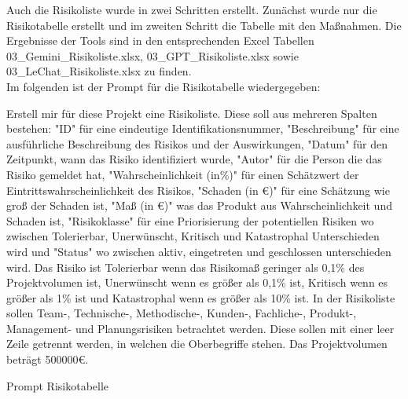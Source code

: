Auch die Risikoliste wurde in zwei Schritten erstellt. Zunächst wurde nur die Risikotabelle erstellt und im zweiten 
Schritt die Tabelle mit den Maßnahmen. Die Ergebnisse der Tools sind in den entsprechenden Excel Tabellen 
03\_Gemini\_Risikoliste.xlsx, 03\_GPT\_Risikoliste.xlsx sowie 03\_LeChat\_Risikoliste.xlsx zu finden.\\

Im folgenden ist der Prompt für die Risikotabelle wiedergegeben:

\begin{prompt}[H]
    \begin{tcolorbox}[colback=gray!20, colframe=gray!20, boxrule=0pt, sharp corners] 
        Erstell mir für diese Projekt eine Risikoliste. Diese soll aus mehreren Spalten bestehen: "ID" für eine 
        eindeutige Identifikationsnummer, "Beschreibung" für eine ausführliche Beschreibung des Risikos und der 
        Auswirkungen, "Datum" für den Zeitpunkt, wann das Risiko identifiziert wurde, "Autor" für die Person die 
        das Risiko gemeldet hat, "Wahrscheinlichkeit (in\%)" für einen Schätzwert der Eintrittswahrscheinlichkeit 
        des Risikos, "Schaden (in €)" für eine Schätzung wie groß der Schaden ist, "Maß (in €)" was das Produkt aus 
        Wahrscheinlichkeit und Schaden ist, "Risikoklasse" für eine Priorisierung der potentiellen Risiken wo 
        zwischen Tolerierbar, Unerwünscht, Kritisch und Katastrophal Unterschieden wird und "Status" wo zwischen 
        aktiv, eingetreten und geschlossen unterschieden wird. Das Risiko ist Tolerierbar wenn das Risikomaß geringer 
        als 0,1\% des Projektvolumen ist, Unerwünscht wenn es größer als 0,1\% ist, Kritisch wenn es größer als 1\% 
        ist und Katastrophal wenn es größer als 10\% ist. In der Risikoliste sollen Team-, Technische-, Methodische-, 
        Kunden-, Fachliche-, Produkt-, Management- und Planungsrisiken betrachtet werden. Diese sollen mit einer 
        leer Zeile getrennt werden, in welchen die Oberbegriffe stehen. Das Projektvolumen beträgt 500000€.
        \vfill
    \end{tcolorbox}
    \caption{Prompt Risikotabelle}
    \label{Prompt Risikotabelle}
\end{prompt}

